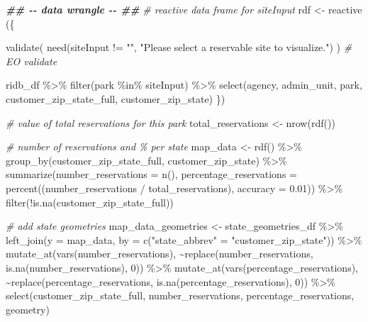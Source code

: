 \documentclass[
  11 pt,
  openany]{book}
\newenvironment{Shaded}{\begin{snugshade}}{\end{snugshade}}
\newcommand{\AttributeTok}[1]{\textcolor[rgb]{0.77,0.63,0.00}{#1}}
\newcommand{\CommentTok}[1]{\textcolor[rgb]{0.56,0.35,0.01}{\textit{#1}}}
\newcommand{\DecValTok}[1]{\textcolor[rgb]{0.00,0.00,0.81}{#1}}
\newcommand{\DocumentationTok}[1]{\textcolor[rgb]{0.56,0.35,0.01}{\textbf{\textit{#1}}}}
\newcommand{\FloatTok}[1]{\textcolor[rgb]{0.00,0.00,0.81}{#1}}
\newcommand{\FunctionTok}[1]{\textcolor[rgb]{0.00,0.00,0.00}{#1}}
\newcommand{\NormalTok}[1]{#1}
\newcommand{\OtherTok}[1]{\textcolor[rgb]{0.56,0.35,0.01}{#1}}
\newcommand{\SpecialCharTok}[1]{\textcolor[rgb]{0.00,0.00,0.00}{#1}}
\newcommand{\StringTok}[1]{\textcolor[rgb]{0.31,0.60,0.02}{#1}}
\begin{document}
\begin{Shaded}
\begin{Highlighting}[]
\DocumentationTok{\#\# {-}{-} data wrangle {-}{-} \#\#}
\CommentTok{\# reactive data frame for siteInput}
\NormalTok{rdf }\OtherTok{\textless{}{-}} \FunctionTok{reactive}\NormalTok{ (\{}
  
  \FunctionTok{validate}\NormalTok{(}
    \FunctionTok{need}\NormalTok{(siteInput }\SpecialCharTok{!=} \StringTok{""}\NormalTok{,}
         \StringTok{"Please select a reservable site to visualize."}\NormalTok{)}
\NormalTok{  ) }\CommentTok{\# EO validate}
  
\NormalTok{  ridb\_df }\SpecialCharTok{\%\textgreater{}\%} 
    \FunctionTok{filter}\NormalTok{(park }\SpecialCharTok{\%in\%}\NormalTok{ siteInput) }\SpecialCharTok{\%\textgreater{}\%}
    \FunctionTok{select}\NormalTok{(agency, admin\_unit, park, customer\_zip\_state\_full, customer\_zip\_state)}
\NormalTok{\})}

\CommentTok{\# value of total reservations for this park}
\NormalTok{total\_reservations }\OtherTok{\textless{}{-}} \FunctionTok{nrow}\NormalTok{(}\FunctionTok{rdf}\NormalTok{())}

\CommentTok{\# number of reservations and \% per state}
\NormalTok{map\_data }\OtherTok{\textless{}{-}} \FunctionTok{rdf}\NormalTok{() }\SpecialCharTok{\%\textgreater{}\%} 
  \FunctionTok{group\_by}\NormalTok{(customer\_zip\_state\_full, customer\_zip\_state) }\SpecialCharTok{\%\textgreater{}\%}
  \FunctionTok{summarize}\NormalTok{(}\AttributeTok{number\_reservations =} \FunctionTok{n}\NormalTok{(),}
            \AttributeTok{percentage\_reservations =} \FunctionTok{percent}\NormalTok{((number\_reservations }\SpecialCharTok{/}\NormalTok{ total\_reservations), }
                                              \AttributeTok{accuracy =} \FloatTok{0.01}\NormalTok{)) }\SpecialCharTok{\%\textgreater{}\%}
  \FunctionTok{filter}\NormalTok{(}\SpecialCharTok{!}\FunctionTok{is.na}\NormalTok{(customer\_zip\_state\_full))}

\CommentTok{\# add state geometries}
\NormalTok{map\_data\_geometries }\OtherTok{\textless{}{-}}
\NormalTok{  state\_geometries\_df }\SpecialCharTok{\%\textgreater{}\%}
  \FunctionTok{left\_join}\NormalTok{(}\AttributeTok{y =}\NormalTok{ map\_data,}
            \AttributeTok{by =} \FunctionTok{c}\NormalTok{(}\StringTok{"state\_abbrev"} \OtherTok{=} \StringTok{"customer\_zip\_state"}\NormalTok{)) }\SpecialCharTok{\%\textgreater{}\%}
  \FunctionTok{mutate\_at}\NormalTok{(}\FunctionTok{vars}\NormalTok{(number\_reservations), }
            \SpecialCharTok{\textasciitilde{}}\FunctionTok{replace}\NormalTok{(number\_reservations, }\FunctionTok{is.na}\NormalTok{(number\_reservations), }\DecValTok{0}\NormalTok{)) }\SpecialCharTok{\%\textgreater{}\%}
  \FunctionTok{mutate\_at}\NormalTok{(}\FunctionTok{vars}\NormalTok{(percentage\_reservations), }
            \SpecialCharTok{\textasciitilde{}}\FunctionTok{replace}\NormalTok{(percentage\_reservations, }\FunctionTok{is.na}\NormalTok{(percentage\_reservations), }\DecValTok{0}\NormalTok{)) }\SpecialCharTok{\%\textgreater{}\%} 
  \FunctionTok{select}\NormalTok{(customer\_zip\_state\_full, number\_reservations, percentage\_reservations, geometry)}


\end{Highlighting}
\end{Shaded}
\end{document}
